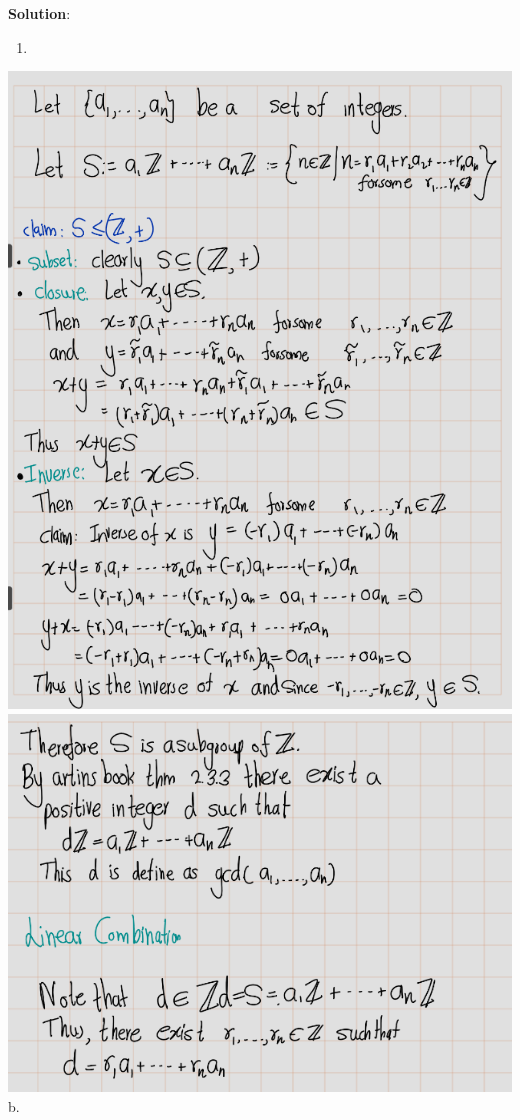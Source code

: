 \documentclass[
]{book}
\providecommand{\tightlist}{%
  \setlength{\itemsep}{0pt}\setlength{\parskip}{0pt}}
\theoremstyle{definition}
\theoremstyle{definition}
\theoremstyle{definition}
\theoremstyle{definition}
\theoremstyle{remark}
\begin{document}
\textbf{Solution}:

\begin{enumerate}
\def\labelenumi{\alph{enumi}.}
\tightlist
\item
\end{enumerate}

\includegraphics{figures/ch_2/fig51.png}
\includegraphics{figures/ch_2/fig52.png}
b.
\end{document}
